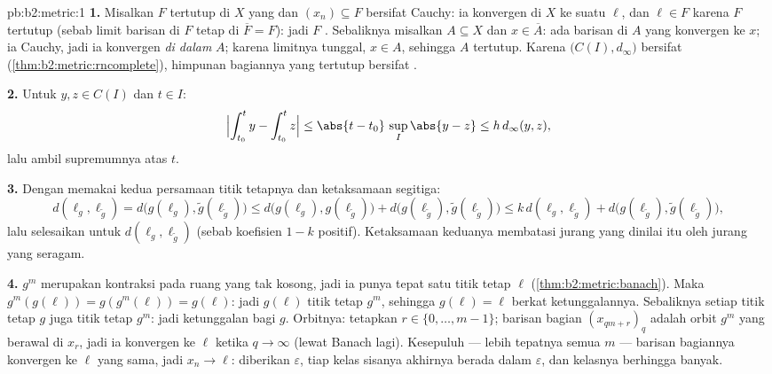 \begin{solution}{pb:b2:metric:1}
\textbf{1.} Misalkan $F$ tertutup di $X$ yang  dan $(x_n)
\subseteq F$ bersifat Cauchy: ia konvergen di $X$ ke suatu $\ell$, dan
$\ell \in F$ karena $F$ tertutup (sebab limit barisan di $F$
tetap di $\overline F = F$): jadi $F$ . Sebaliknya misalkan $A
\subseteq X$  dan $x \in \overline A$: ada barisan
di $A$ yang konvergen ke $x$; ia Cauchy, jadi ia konvergen \emph{di
dalam} $A$; karena limitnya tunggal, $x \in A$, sehingga $A$ tertutup.
Karena $\bigl(C(I), d_\infty\bigr)$ bersifat 
(\cref{thm:b2:metric:rncomplete}), himpunan bagiannya yang tertutup
bersifat .

\textbf{2.} Untuk $y, z \in C(I)$ dan $t \in I$:
\[
\Bigl|\int_{t_0}^{t}y - \int_{t_0}^{t}z\Bigr| \leq
\abs{t - t_0}\,\sup_I\abs{y - z} \leq h\,d_\infty(y, z),
\]
lalu ambil supremumnya atas $t$.

\textbf{3.} Dengan memakai kedua persamaan titik tetapnya dan
ketaksamaan segitiga:
\[
d(\ell_g, \ell_{\widetilde g})
= d\bigl(g(\ell_g), \widetilde g(\ell_{\widetilde g})\bigr)
\leq d\bigl(g(\ell_g), g(\ell_{\widetilde g})\bigr) +
d\bigl(g(\ell_{\widetilde g}), \widetilde g(\ell_{\widetilde
g})\bigr)
\leq k\,d(\ell_g, \ell_{\widetilde g}) +
d\bigl(g(\ell_{\widetilde g}), \widetilde g(\ell_{\widetilde
g})\bigr),
\]
lalu selesaikan untuk $d(\ell_g, \ell_{\widetilde g})$ (sebab koefisien
$1 - k$ positif). Ketaksamaan keduanya membatasi jurang yang dinilai itu
oleh jurang yang seragam.

\textbf{4.} $g^m$ merupakan kontraksi pada ruang  yang tak kosong,
jadi ia punya tepat satu titik tetap $\ell$
(\cref{thm:b2:metric:banach}). Maka $g^m(g(\ell)) =
g(g^m(\ell)) = g(\ell)$: jadi $g(\ell)$ titik tetap $g^m$,
sehingga $g(\ell) = \ell$ berkat ketunggalannya. Sebaliknya setiap titik
tetap $g$ juga titik tetap $g^m$: jadi ketunggalan bagi $g$. Orbitnya:
tetapkan $r \in \{0, \dots, m-1\}$; barisan bagian $(x_{qm + r})_q$
adalah orbit $g^m$ yang berawal di $x_r$, jadi ia konvergen ke $\ell$
ketika $q \to \infty$ (lewat Banach lagi). Kesepuluh
--- lebih tepatnya semua $m$ --- barisan bagiannya konvergen ke $\ell$
yang sama, jadi $x_n \to \ell$: diberikan $\varepsilon$, tiap kelas
sisanya akhirnya berada dalam $\varepsilon$, dan kelasnya berhingga banyak.


\end{solution}
